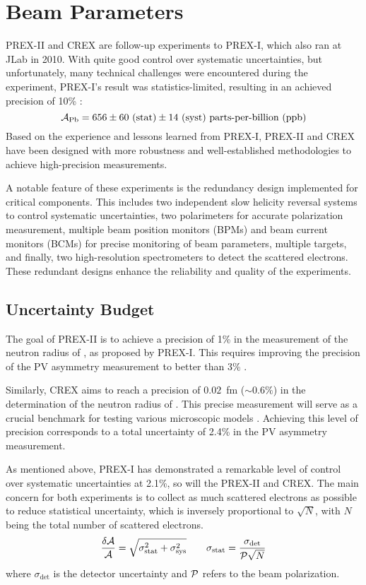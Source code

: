 \section{Beam Parameters}
PREX-II and CREX are follow-up experiments to PREX-I, which also ran at JLab in 2010. 
With quite good control over systematic uncertainties, but unfortunately, 
many technical challenges were encountered during the experiment, PREX-I's result was
statistics-limited, resulting in an achieved precision of 10\% \cite{PhysRevLett.108.112502}:
$$ \mathcal{A}_{\text{Pb}} = 656 \pm 60 \ (\text{stat}) \pm 14 \ (\text{syst}) \ \text{parts-per-billion (ppb)} $$
Based on the experience and lessons learned from PREX-I, 
PREX-II and CREX have been designed with more robustness and well-established methodologies to achieve high-precision measurements.

A notable feature of these experiments is the redundancy design implemented for critical components. This includes two independent slow helicity reversal systems to control systematic uncertainties, two polarimeters for accurate polarization measurement, multiple beam position monitors (BPMs) and beam current monitors (BCMs) for precise monitoring of beam parameters, multiple \Pb targets, and finally, two high-resolution spectrometers to detect the scattered electrons. These redundant designs enhance the reliability and quality of the experiments.

\subsection{Uncertainty Budget}
The goal of PREX-II is to achieve a precision of 1\% in the measurement of the 
neutron radius of \Pb, as proposed by PREX-I. This requires improving the 
precision of the PV asymmetry measurement to better than 3\% \cite{PhysRevLett.106.252501}. 

Similarly, CREX aims to reach a precision of $0.02$~fm ($\sim 0.6\%$) in the
determination of the neutron radius of \Ca.
This precise measurement will serve as a crucial benchmark for testing various microscopic models \cite{crex_proposal}. Achieving this level of precision corresponds to a total uncertainty of 2.4\% in the PV asymmetry measurement.

As mentioned above, PREX-I has demonstrated a remarkable level of control over 
systematic uncertainties at 2.1\%, so will the PREX-II and CREX. 
The main concern for both experiments is to collect as much scattered 
electrons as possible to reduce statistical uncertainty, which is inversely 
proportional to $\sqrt{N}$, with $N$ being the total number of scattered electrons.
\begin{equation}
    \frac{\delta \mathcal{A}}{\mathcal{A}} = \sqrt{\sigma^2_{\text{stat}} + \sigma^2_{\text{sys}}}	
    \qquad 
    \sigma_{\text{stat}} = \frac{\sigma_{\text{det}}}{\mathcal{P}\sqrt{N}}
\end{equation}
where $\sigma_{\text{det}}$ is the detector uncertainty and $\mathcal{P}$ refers to the beam polarization.


